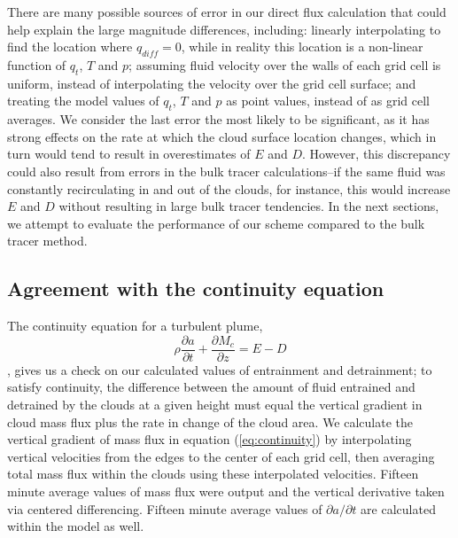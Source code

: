 \documentclass[12pt]{article}
\begin{document}
There are many possible sources of error in our direct flux calculation that 
could help explain the large magnitude differences, including: linearly
interpolating to find the location where $q_{diff} = 0$, while in reality this
location is a non-linear function of $q_t$, $T$ and $p$; assuming fluid velocity
over the walls of each grid cell is uniform, instead of interpolating the 
velocity over the grid cell surface; and treating the model values of $q_t$, 
$T$ and $p$ as point values, instead of as grid cell averages.  We consider the
last error the most likely to be significant, as it has strong effects on the 
rate at which the cloud surface location changes, which in turn would tend to 
result in overestimates of $E$ and $D$.  However, this discrepancy could also
result from errors in the bulk tracer calculations--if the same fluid was 
constantly recirculating in and out of the clouds, for instance, this would 
increase $E$ and $D$ without resulting in large bulk tracer tendencies.  In the
next sections, we attempt to evaluate the performance of our scheme compared to 
the bulk tracer method.


\subsection{Agreement with the continuity equation}

The continuity equation for a turbulent plume, 
\begin{equation}
    \label{eq:continuity}
    \rho \frac{\partial a}{\partial t} 
    + \frac{\partial M_c}{\partial z}
    = E - D
\end{equation},
gives us a check on our calculated values of entrainment and detrainment; to 
satisfy continuity, the difference between the amount of fluid entrained and 
detrained by the clouds at a given height must equal the vertical gradient in 
cloud mass flux plus the rate in change of the cloud area.  We calculate the 
vertical gradient of mass flux in equation (\ref{eq:continuity}) by 
interpolating vertical velocities from the edges to the center of each grid 
cell, then averaging total mass flux within the clouds using these interpolated 
velocities.  Fifteen minute average values of mass flux were output and the 
vertical derivative taken via centered differencing.  Fifteen minute average 
values of $\partial a/\partial t$ are calculated within the model as well.
\end{document}
